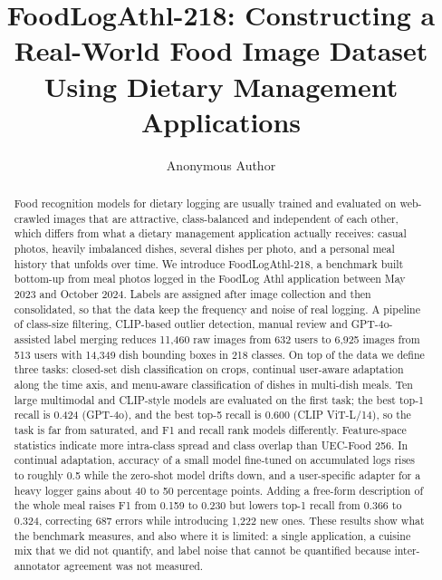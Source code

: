 \documentclass[sigconf, nonacm]{acmart}
\begin{document}
\title{FoodLogAthl-218: Constructing a Real-World Food Image Dataset\\ Using Dietary Management Applications}


\author{Anonymous Author}

\begin{abstract}
Food recognition models for dietary logging are usually trained and evaluated on web-crawled images that are attractive, class-balanced and independent of each other, which differs from what a dietary management application actually receives: casual photos, heavily imbalanced dishes, several dishes per photo, and a personal meal history that unfolds over time. We introduce FoodLogAthl-218, a benchmark built bottom-up from meal photos logged in the FoodLog Athl application between May 2023 and October 2024. Labels are assigned after image collection and then consolidated, so that the data keep the frequency and noise of real logging. A pipeline of class-size filtering, CLIP-based outlier detection, manual review and GPT-4o-assisted label merging reduces 11,460 raw images from 632 users to 6,925 images from 513 users with 14,349 dish bounding boxes in 218 classes. On top of the data we define three tasks: closed-set dish classification on crops, continual user-aware adaptation along the time axis, and menu-aware classification of dishes in multi-dish meals. Ten large multimodal and CLIP-style models are evaluated on the first task; the best top-1 recall is 0.424 (GPT-4o), and the best top-5 recall is 0.600 (CLIP ViT-L/14), so the task is far from saturated, and F1 and recall rank models differently. Feature-space statistics indicate more intra-class spread and class overlap than UEC-Food 256. In continual adaptation, accuracy of a small model fine-tuned on accumulated logs rises to roughly 0.5 while the zero-shot model drifts down, and a user-specific adapter for a heavy logger gains about 40 to 50 percentage points. Adding a free-form description of the whole meal raises F1 from 0.159 to 0.230 but lowers top-1 recall from 0.366 to 0.324, correcting 687 errors while introducing 1,222 new ones. These results show what the benchmark measures, and also where it is limited: a single application, a cuisine mix that we did not quantify, and label noise that cannot be quantified because inter-annotator agreement was not measured.
\end{abstract}

\maketitle
\end{document}
